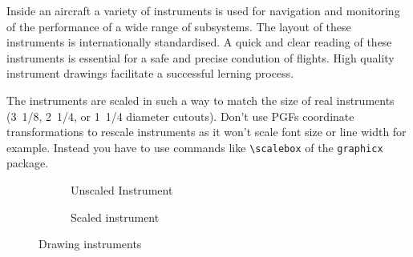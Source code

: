 Inside an aircraft a variety of instruments is used for navigation and
monitoring of the performance of a wide range of subsystems. The layout of
these instruments is internationally standardised. A quick and clear reading
of these instruments is essential for a safe and precise condution of flights.
High quality instrument drawings facilitate a successful lerning process.

The instruments are scaled in such a way to match the size of real instruments
(\SI[quotient-mode=fraction,fraction-function=\sfrac]{1/8}[3]{\inch},
\SI[quotient-mode=fraction,fraction-function=\sfrac]{1/4}[2]{\inch}, or
\SI[quotient-mode=fraction,fraction-function=\sfrac]{1/4}[1]{\inch} diameter
cutouts). Don't use PGFs coordinate transformations to rescale instruments as
it won't scale font size or line width for example. Instead you have to use
commands like \lstinline+\scalebox+ of the \texttt{graphicx} package.

\begin{figure}[!h]
\begin{subfigure}{\linewidth}
\centering
{}
\caption{Unscaled Instrument}
\end{subfigure}

\bigskip

\begin{subfigure}{\linewidth}
\centering
{}
\caption{Scaled instrument}
\end{subfigure}

\caption{Drawing instruments}
\end{figure}
